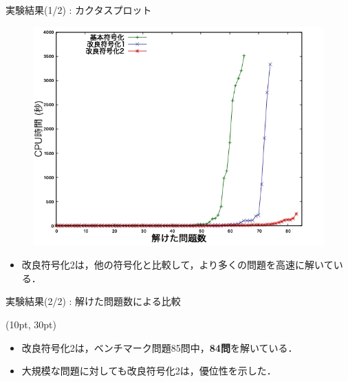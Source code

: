 \documentclass[dvipdfmx,11pt]{beamer}
\begin{document}
\begin{frame}{実験結果(1/2) : カクタスプロット}
 \begin{figure}[h]
  \centering
  \includegraphics[scale=0.4]{fig/cactus.png}
 \end{figure}

\begin{itemize}
 \item 改良符号化2は，他の符号化と比較して，より多くの問題を高速に解いている．
\end{itemize}\vfill
\end{frame}
\begin{frame}{実験結果(2/2) : 解けた問題数による比較}
 
\begin{textblock*}{\linewidth}(10pt, 30pt)
\begin{table}[t]
 
\end{table}\vfill

\begin{itemize}
 \item 改良符号化2は，ベンチマーク問題85問中，\textbf{84問}を解いている．
 \item 大規模な問題に対しても改良符号化2は，優位性を示した．
\end{itemize}\vfill
\end{textblock*}
\end{frame}
\end{document}
